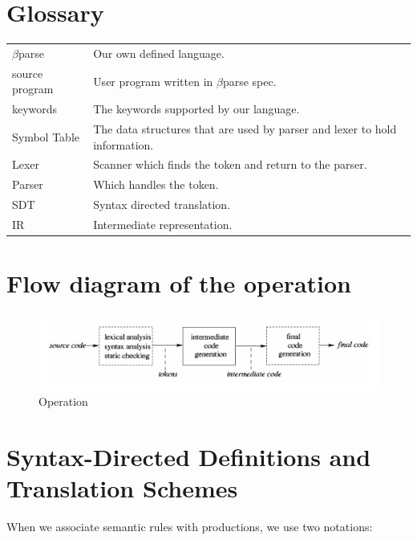 \documentclass[12pt, oneside, a4paper]{article}
\begin{document}
\section{Glossary}
\begin{tabular}{ll}
$\beta$parse & Our own defined language.\\
source program & User program written in $\beta$parse spec.\\
keywords & The keywords supported by our language.\\
Symbol Table & The data structures that are used by parser and lexer to hold information.\\
Lexer & Scanner which finds the token and return to the parser.\\
Parser & Which handles the token.\\
SDT & Syntax directed translation.\\
IR & Intermediate representation.\\

\end{tabular}

\section{Flow diagram of the operation}
\begin{figure}[htb]
\begin{center}
\ifpdf
	\includegraphics[scale=0.50]{snapshot6.png}
\else
\fi
\caption{Operation}
\end{center}
\end{figure}

\section{Syntax-Directed Definitions and Translation Schemes}

When we associate semantic rules with productions, we use two notations:
\end{document}

